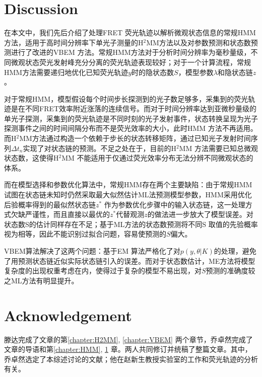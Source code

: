 \documentclass[11pt, a4paper]{article}
\begin{document}
\section{Discussion}\label{chapter:Discussion}
在本文中，我们先后介绍了处理FRET 荧光轨迹以解析微观状态信息的常规HMM方法，适用于高时间分辨率下单光子测量的H$^2$MM方法以及对参数预测和状态数预测进行了改进的VBEM 方法。常规HMM方法对于分析时间分辨率为毫秒量级，不同微观状态荧光发射峰充分分离的荧光轨迹表现较好；对于一个计算流程，常规HMM方法需要递归地优化已知荧光轨迹$y$时的隐状态数$S$，模型参数$\lambda$和隐状态链$z$。

对于常规HMM，模型假设每个时间步长探测到的光子数足够多，采集到的荧光轨迹是在不同FRET效率附近涨落的连续信号。而对于时间分辨率达到亚微秒量级的单光子探测，采集到的荧光轨迹是不同时刻的光子发射事件，状态转换呈现为光子探测事件之间的时间间隔分布而不是荧光效率的大小，此时HMM 方法不再适用。而H$^2$MM方法通过构造一个依赖于步长的状态转移矩阵，通过已知光子发射时间序列$\Delta t_n$实现了对状态链的预测。不足之处在于，目前的H$^2$MM 方法需要已知总微观状态数，这使得H$^2$MM 不能适用于仅通过荧光效率分布无法分辨不同微观状态的体系。

而在模型选择和参数优化算法中，常规HMM存在两个主要缺陷：由于常规HMM 试图在状态链未知时仍然采取最大似然估计ML法预测模型参数，HMM采用优化后验概率得到的最似然状态链$z^*$ 作为参数优化步骤中的输入状态链，这一处理方式欠缺严谨性，而且直接以最优的$z^*$代替观测$z$的做法进一步放大了模型误差。对状态数S的估计同样存在不足；基于ML方法的状态数预测将不同S 取值的先验概率视为相等，因此不能识别过拟合问题，容易使预测的$S$偏大。

VBEM算法解决了这两个问题：基于EM 算法严格化了对$p(y,\theta|K)$的处理，避免了用预测状态链近似实际状态链引入的误差。而对于状态数估计，ME方法将模型复杂度的出现权重考虑在内，使得过于复杂的模型不易出现，对$S$预测的准确度较之ML方法有明显提升。


\section{Acknowledgement}
    滕达完成了文章的第\ref{chapter:H2MM}, \ref{chapter:VBEM} 两个章节，乔卓然完成了文章的导语和第\ref{chapter:HMM}, \ref{chapter:Discussion} 章。两人共同修订并统稿了整篇文章。其中，乔卓然选定了本综述讨论的文献；他在赵新生教授实验室的工作和荧光轨迹的分析有关。


\small


\end{document}
